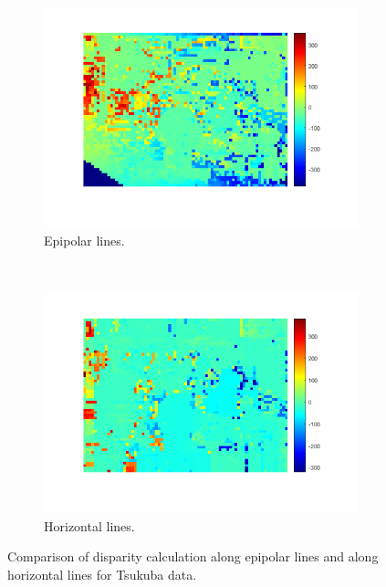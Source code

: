 \documentclass[a4paper, 10pt, conference]{ieeeconf}
\begin{document}
\begin{figure}[!ht]
  \captionsetup[subfigure]{position=b}
  \centering
    \begin{subfigure}{0.45\linewidth}
      \includegraphics[width=\textwidth]{pic/q2_2_cd1_dis}
      \caption{Epipolar lines.}
      \label{fig:q2_2_cd1_tkb}
    \end{subfigure}
    ~
    \begin{subfigure}{0.45\linewidth}
      \includegraphics[width=\textwidth]{pic/q2_2_cd2_dis}
      \caption{Horizontal lines.}
      \label{fig:q2_2_cd3_tkb}
    \end{subfigure}

	\caption{Comparison of disparity calculation along epipolar lines and along horizontal lines for Tsukuba data. }
  \label{fig:q2_2_cd_tkb}
\end{figure}
\end{document}
